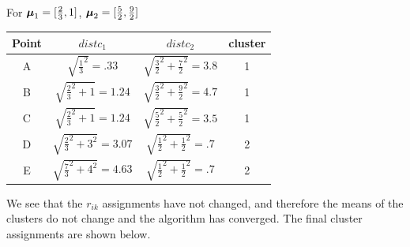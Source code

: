 \documentclass[12pt,letterpaper]{article}
\begin{document}
\begin{enumerate}
\begin{solution}
\begin{align*}
\end{align*}
For $\boldsymbol{\mu}_1 = [\frac{2}{3},1]$, $\boldsymbol{\mu}_2 = [\frac{5}{2},\frac{9}{2}]$
\begin{center}
\begin{tabular}{ |c|c|c|c| } 
 \hline
 Point & $distc_1 $& $distc_2$ & cluster \\ 
 \hline 
 A & $\sqrt{\frac{1}{3}^2} = .33$ & $\sqrt{\frac{3}{2}^2 + \frac{7}{2}^2} = 3.8$ & 1\\ 
 B &   $\sqrt{\frac{2}{3}^2 + 1} = 1.24$ &  $\sqrt{\frac{3}{2}^2 + \frac{9}{2}^2} = 4.7$ & 1\\ 
 C &  $\sqrt{\frac{2}{3}^2 + 1} = 1.24$& $\sqrt{\frac{5}{2}^2 + \frac{5}{2}^2} = 3.5$ & 1 \\ 
 D & $\sqrt{\frac{2}{3}^2 + 3^2} = 3.07$ & $\sqrt{\frac{1}{2}^2 + \frac{1}{2}^2} = .7$ & 2\\
 E & $\sqrt{\frac{7}{3}^2 + 4^2} = 4.63$ & $\sqrt{\frac{1}{2}^2 + \frac{1}{2}^2} = .7$& 2\\  
 \hline
\end{tabular}
\end{center}

We see that the $r_{ik}$ assignments have not changed, and therefore the means of the clusters do not change and the algorithm has converged. The final cluster assignments are shown below.

\begin{center}
\end{center}
\end{solution}




\end{enumerate}
\end{document}
